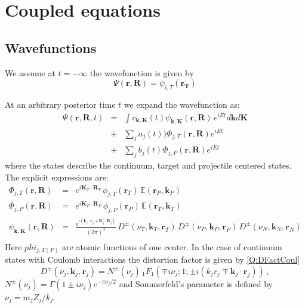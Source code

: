 \documentclass[english,oneside]{book}
\begin{document}
\chapter{Coupled equations}
\section{Wavefunctions}

We assume at $t=-\infty$ the wavefunction is given by
\[
\Psi(\mathbf{r},\mathbf{R}) = \psi_{i,T} (\mathbf{r_{T}})
\]

At an arbitrary posterior time $t$ we expand the wavefunction as:
\begin{eqnarray}
\Psi(\mathbf{r},\mathbf{R},t) &=&
  \int c_{\mathbf{k},\mathbf{K}}(t) \psi_{\mathbf{k},\mathbf{K}}(\mathbf{r},\mathbf{R})\,
  e^{i E t}  d \mathbf{k} d \mathbf{K}  \\
&+& \sum_{j} a_{j}(t)) \Phi_{j,T}(\mathbf{r},\mathbf{R}) e^{i E t}
\nonumber \\
&+& \sum_{j}  b_{j}(t) \Phi_{j,P}(\mathbf{r},\mathbf{R}) e^{i E t}
\nonumber
\end{eqnarray}
%
where the states describe the continuum, target and projectile centered
states. The explicit expressions are:
\begin{eqnarray}\label{Q:CE-fi-T}
  \Phi_{j,T}(\mathbf{r},\mathbf{R}) &=& e^{i \mathbf{K}_{T} \cdot \mathbf{R}_{T}} \,
  \phi_{j,T}(\mathbf{r}_{T}) \,  \mathbb{E}(\mathbf{r}_{P},\mathbf{k}_{P})
  \\
  \Phi_{j,P}(\mathbf{r},\mathbf{R}) &=& e^{i \mathbf{K}_{P} \cdot \mathbf{R}_{P}} \,
  \phi_{j,P}(\mathbf{r}_{P}) \,  \mathbb{E}(\mathbf{r}_{T},\mathbf{k}_{T})
  \\
  \psi_{\mathbf{k},\mathbf{K}}(\mathbf{r},\mathbf{R}) &=& \frac{e^{i
(\mathbf{k}_j\cdot \mathbf{r}_j+\mathbf{K}_j\cdot \mathbf{R}_j)}}{(2
\pi)^3} \,
 D^{\pm}(\nu_T,\mathbf{k}_T,\mathbf{r}_T) \, D^{\pm}(\nu_P,\mathbf{k}_P,\mathbf{r}_P)
 \,D^{\pm}(\nu_N,\mathbf{k}_N,\mathbf{r}_N) \nonumber \\
\end{eqnarray}
Here $phi_{j,T(P)}$ are atomic functions of one center. In the case of
continuum states with Coulomb interactions the distortion factor is
given by \ref{Q:DFactCoul}
%
\[
D^{\pm}(\nu_j,\mathbf{k}_{j},\mathbf{r}_{j})= N^{\pm}(\nu_{j}) \,{_1F_1}\left(
\mp i \nu_{j};1; {\pm} i (k_{j} r_{j} \mp \mathbf{k}_{j}
\cdot\mathbf{r}_{j} ) \right) \, ,
\]
%
$N^{\pm}(\nu_j)= \Gamma(1 {\pm} i\nu_j) e^{-\pi \nu_j/2}$ and Sommerfeld's
parameter is defined by $\nu_j = m_j Z_j/ k_j$.
\end{document}
